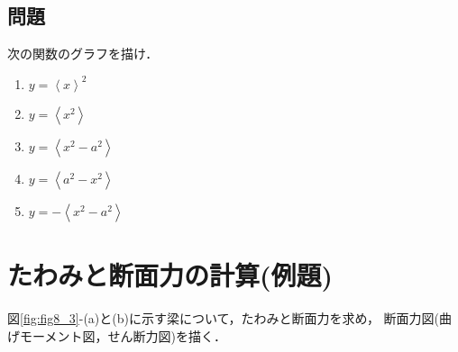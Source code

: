 \documentclass[10pt,a4j]{jbook}
\begin{document}
\subsection{問題}
次の関数のグラフを描け．
\begin{enumerate}
\item $y=\left< x \right>^2$
\item $y=\left< x^2 \right>$
\item $y=\left< x^2-a^2 \right>$
\item $y=\left< a^2-x^2 \right>$
\item $y=-\left< x^2-a^2 \right>$
\end{enumerate}
\section{たわみと断面力の計算(例題)}
図\ref{fig:fig8_3}-(a)と(b)に示す梁について，たわみと断面力を求め，
断面力図(曲げモーメント図，せん断力図)を描く．
\renewcommand{\labelenumi}{(\alph{enumi})}
\end{document}
